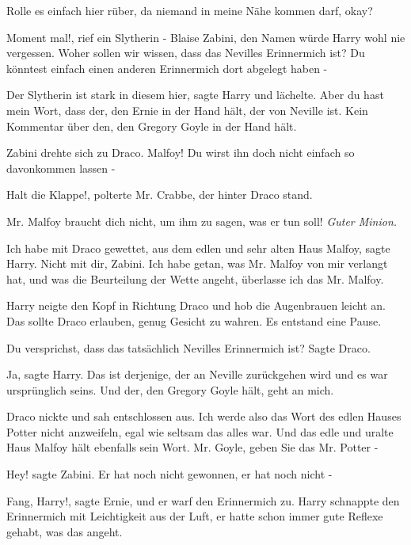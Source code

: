 \glqq{}Rolle es einfach hier rüber, da niemand in meine Nähe kommen darf,
okay?\grqq{}

\glqq{}Moment mal!\grqq{}, rief ein Slytherin - Blaise Zabini, den Namen würde
Harry wohl nie vergessen. \glqq{}Woher sollen wir wissen, dass das Nevilles
Erinnermich ist? Du könntest einfach einen anderen Erinnermich dort abgelegt
haben -\grqq{}

\glqq{}Der Slytherin ist stark in diesem hier\grqq{}, sagte Harry und lächelte.
\glqq{}Aber du hast mein Wort, dass der, den Ernie in der Hand hält, der von
Neville ist. Kein Kommentar über den, den Gregory Goyle in der Hand hält.\grqq{}

Zabini drehte sich zu Draco. \glqq{}Malfoy! Du wirst ihn doch nicht einfach so
davonkommen lassen -\grqq{}

\glqq{}Halt die Klappe!\grqq{}, polterte Mr. Crabbe, der hinter Draco stand.

\glqq{}Mr. Malfoy braucht dich nicht, um ihm zu sagen, was er tun soll!\grqq{}
\emph{Guter Minion.}

\glqq{}Ich habe mit Draco gewettet, aus dem edlen und sehr alten Haus
Malfoy\grqq{}, sagte Harry. \glqq{}Nicht mit dir, Zabini. Ich habe getan, was Mr.
Malfoy von mir verlangt hat, und was die Beurteilung der Wette angeht, überlasse
ich das Mr. Malfoy.\grqq{}

Harry neigte den Kopf in Richtung Draco und hob die Augenbrauen leicht an. Das
sollte Draco erlauben, genug Gesicht zu wahren. Es entstand eine Pause.

\glqq{}Du versprichst, dass das tatsächlich Nevilles Erinnermich ist?\grqq{}
Sagte Draco.

\glqq{}Ja\grqq{}, sagte Harry. \glqq{}Das ist derjenige, der an Neville
zurückgehen wird und es war ursprünglich seins. Und der, den Gregory Goyle hält,
geht an mich.\grqq{}

Draco nickte und sah entschlossen aus. \glqq{}Ich werde also das Wort des edlen
Hauses Potter nicht anzweifeln, egal wie seltsam das alles war. Und das edle und
uralte Haus Malfoy hält ebenfalls sein Wort. Mr. Goyle, geben Sie das Mr. Potter
-\grqq{}

\glqq{}Hey!\grqq{} sagte Zabini. \glqq{}Er hat noch nicht gewonnen, er hat noch
nicht -\grqq{}

\glqq{}Fang, Harry!\grqq{}, sagte Ernie, und er warf den Erinnermich zu. Harry
schnappte den Erinnermich mit Leichtigkeit aus der Luft, er hatte schon immer
gute Reflexe gehabt, was das angeht.

